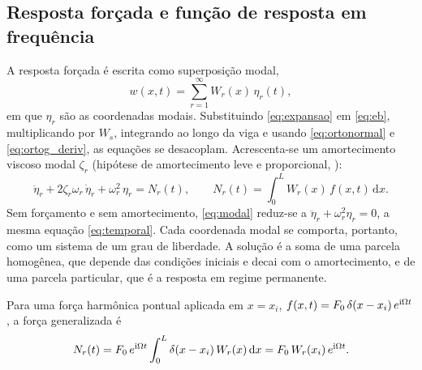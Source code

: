 

\subsection{Resposta forçada e função de resposta em frequência}
\label{sec:frf}

A resposta forçada é escrita como superposição modal,
\begin{equation}
    w(x,t) = \sum_{r=1}^{\infty} W_r(x)\,\eta_r(t),
    \label{eq:expansao}
\end{equation}
em que $\eta_r$ são as coordenadas modais. Substituindo \eqref{eq:expansao} em
\eqref{eq:eb}, multiplicando por $W_s$, integrando ao longo da viga e usando
\eqref{eq:ortonormal} e \eqref{eq:ortog_deriv}, as equações se desacoplam. Acrescenta-se
um amortecimento viscoso modal $\zeta_r$ (hipótese de amortecimento leve e
proporcional, \cite{ewins2000}):
\begin{equation}
    \ddot\eta_r + 2\zeta_r\omega_r\,\dot\eta_r + \omega_r^2\,\eta_r = N_r(t),
    \qquad N_r(t) = \int_0^L W_r(x)\,f(x,t)\,\mathrm{d}x.
    \label{eq:modal}
\end{equation}
Sem forçamento e sem amortecimento, \eqref{eq:modal} reduz-se a
$\ddot\eta_r + \omega_r^2\eta_r = 0$, a mesma equação \eqref{eq:temporal}. Cada
coordenada modal se comporta, portanto, como um sistema de um grau de liberdade.
A solução é a soma de uma parcela homogênea, que depende das condições iniciais e
decai com o amortecimento, e de uma parcela particular, que é a resposta em regime
permanente.

Para uma força harmônica pontual aplicada em $x = x_i$,
$f(x,t) = F_0\,\delta(x - x_i)\,e^{\mathrm{i}\Omega t}$, a força generalizada é
\begin{equation}
    N_r(t) = F_0\,e^{\mathrm{i}\Omega t}\int_0^L \delta(x - x_i)\,W_r(x)\,\mathrm{d}x
    = F_0\,W_r(x_i)\,e^{\mathrm{i}\Omega t}.
    \label{eq:Nr}
\end{equation}

